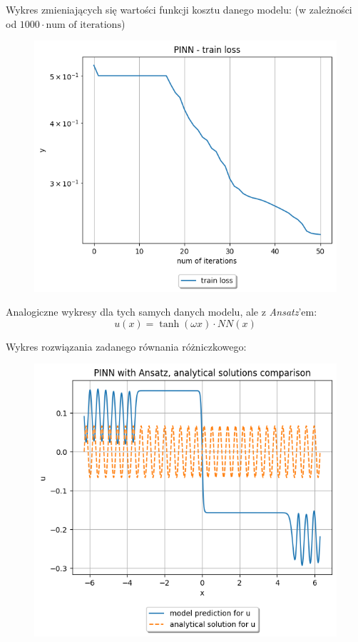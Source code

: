 \documentclass{article}
\begin{document}
Wykres zmieniających się wartości funkcji kosztu danego modelu:
(w zależności od $1000 \cdot \text{num of iterations}$)\\

\begin{figure}[H]
  \includegraphics[width=\linewidth]{figures/2_train.png}
\end{figure}

Analogiczne wykresy dla tych samych danych modelu, ale z \textit{Ansatz}'em:
$$u(x) = \tanh(\omega x) \cdot NN(x) $$

Wykres rozwiązania zadanego równania różniczkowego: \\

\begin{figure}[H]
  \includegraphics[width=\linewidth]{figures/2_ans.png}
\end{figure}
\end{document}

